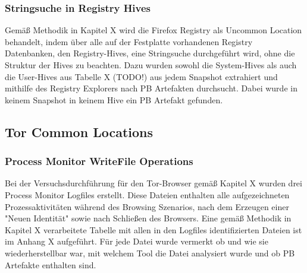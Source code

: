 \begin{appendices}
\subsubsection*{Stringsuche in Registry Hives}

Gemäß Methodik in Kapitel X wird die Firefox Registry als Uncommon Location behandelt, indem über alle auf der Festplatte vorhandenen Registry Datenbanken, den Registry-Hives, eine Stringsuche durchgeführt wird, ohne die Struktur der Hives zu beachten. 
Dazu wurden sowohl die System-Hives als auch die User-Hives aus Tabelle X (TODO!) aus jedem Snapshot extrahiert und mithilfe des Registry Explorers nach PB Artefakten durchsucht.
Dabei wurde in keinem Snapshot in keinem Hive ein PB Artefakt gefunden.





\subsection*{Tor Common Locations}

\subsubsection*{Process Monitor WriteFile Operations}

Bei der Versuchsdurchführung für den Tor-Browser gemäß Kapitel X wurden drei Process Monitor Logfiles erstellt.
Diese Dateien enthalten alle aufgezeichneten Prozessaktivitäten während des Browsing Szenarios, nach dem Erzeugen einer "Neuen Identität" sowie nach Schließen des Browsers.
Eine gemäß Methodik in Kapitel X verarbeitete Tabelle mit allen in den Logfiles identifizierten Dateien ist im Anhang X aufgeführt.
Für jede Datei wurde vermerkt ob und wie sie wiederherstellbar war, mit welchem Tool die Datei analysiert wurde und ob PB Artefakte enthalten sind.


\end{appendices}

